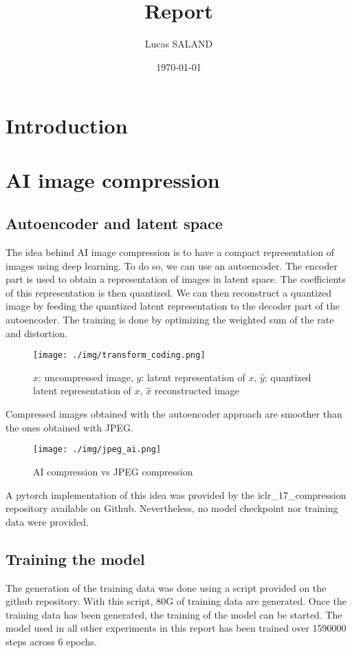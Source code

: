 \documentclass[12pt]{article}
\title{Report}
\author{Lucas SALAND}
\date{\today}
\begin{document}
\section*{Introduction}

\section{AI image compression}
\subsection{Autoencoder and latent space}
The idea behind AI image compression is to have a compact representation of images using deep learning. To do so, we can use an autoencoder. The encoder part is used to obtain a representation of images in latent space. The coefficients of this representation is then quantized. We can then reconstruct a quantized image by feeding the quantized latent representation to the decoder part of the autoencoder. The training is done by optimizing the weighted sum of the rate and distortion.
\begin{figure}[H]
    \centering
    \texttt{[image: ./img/transform\_coding.png]}
    \caption[short]{$x$: uncompressed image, $y$: latent representation of $x$, $\hat{y}$: quantized latent representation of $x$, $\hat{x}$ reconstructed image}
\end{figure}
Compressed images obtained with the autoencoder approach are smoother than the ones obtained with JPEG.
\begin{figure}
    \centering
    \texttt{[image: ./img/jpeg\_ai.png]}
    \caption[short]{AI compression vs JPEG compression}
\end{figure}

A pytorch implementation of this idea was provided by the iclr\_17\_compression repository available on Github. Nevertheless, no model checkpoint nor training data were provided.


\subsection{Training the model}
The generation of the training data was done using a script provided on the github repository. With this script, 80G of training data are generated. Once the training data has been generated, the training of the model can be started. The model used in all other experiments in this report has been trained over 1590000 steps across 6 epochs.
\end{document}

